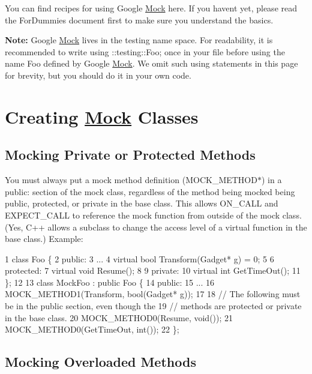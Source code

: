 You can find recipes for using Google \hyperlink{classMock}{Mock} here. If you haven\textquotesingle{}t yet, please read the For\+Dummies document first to make sure you understand the basics.

{\bfseries Note\+:} Google \hyperlink{classMock}{Mock} lives in the {\ttfamily testing} name space. For readability, it is recommended to write {\ttfamily using \+::testing\+::\+Foo;} once in your file before using the name {\ttfamily Foo} defined by Google \hyperlink{classMock}{Mock}. We omit such {\ttfamily using} statements in this page for brevity, but you should do it in your own code.

\section*{Creating \hyperlink{classMock}{Mock} Classes}

\subsection*{Mocking Private or Protected Methods}

You must always put a mock method definition ({\ttfamily M\+O\+C\+K\+\_\+\+M\+E\+T\+H\+O\+D$\ast$}) in a {\ttfamily public\+:} section of the mock class, regardless of the method being mocked being {\ttfamily public}, {\ttfamily protected}, or {\ttfamily private} in the base class. This allows {\ttfamily O\+N\+\_\+\+C\+A\+LL} and {\ttfamily E\+X\+P\+E\+C\+T\+\_\+\+C\+A\+LL} to reference the mock function from outside of the mock class. (Yes, C++ allows a subclass to change the access level of a virtual function in the base class.) Example\+:


\begin{DoxyCode}
1 class Foo \{
2  public:
3   ...
4   virtual bool Transform(Gadget* g) = 0;
5 
6  protected:
7   virtual void Resume();
8 
9  private:
10   virtual int GetTimeOut();
11 \};
12 
13 class MockFoo : public Foo \{
14  public:
15   ...
16   MOCK\_METHOD1(Transform, bool(Gadget* g));
17 
18   // The following must be in the public section, even though the
19   // methods are protected or private in the base class.
20   MOCK\_METHOD0(Resume, void());
21   MOCK\_METHOD0(GetTimeOut, int());
22 \};
\end{DoxyCode}


\subsection*{Mocking Overloaded Methods}

